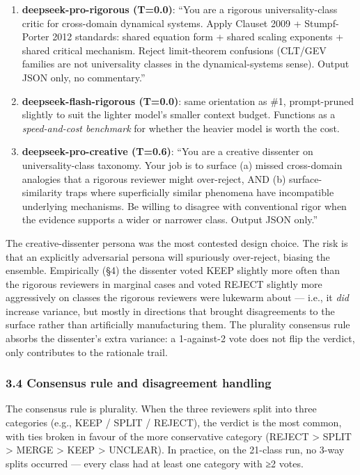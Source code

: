 \documentclass[
  letterpaper,
  11pt]{article}
\providecommand{\tightlist}{%
  \setlength{\itemsep}{0pt}\setlength{\parskip}{0pt}}
\begin{document}
\begin{enumerate}
\def\labelenumi{\arabic{enumi}.}
\tightlist
\item
  \textbf{deepseek-pro-rigorous (T=0.0)}: ``You are a rigorous
  universality-class critic for cross-domain dynamical systems. Apply
  Clauset 2009 + Stumpf-Porter 2012 standards: shared equation form +
  shared scaling exponents + shared critical mechanism. Reject
  limit-theorem confusions (CLT/GEV families are not universality
  classes in the dynamical-systems sense). Output JSON only, no
  commentary.''
\item
  \textbf{deepseek-flash-rigorous (T=0.0)}: same orientation as \#1,
  prompt-pruned slightly to suit the lighter model's smaller context
  budget. Functions as a \emph{speed-and-cost benchmark} for whether the
  heavier model is worth the cost.
\item
  \textbf{deepseek-pro-creative (T=0.6)}: ``You are a creative dissenter
  on universality-class taxonomy. Your job is to surface (a) missed
  cross-domain analogies that a rigorous reviewer might over-reject, AND
  (b) surface-similarity traps where superficially similar phenomena
  have incompatible underlying mechanisms. Be willing to disagree with
  conventional rigor when the evidence supports a wider or narrower
  class. Output JSON only.''
\end{enumerate}

The creative-dissenter persona was the most contested design choice. The
risk is that an explicitly adversarial persona will spuriously
over-reject, biasing the ensemble. Empirically (§4) the dissenter voted
KEEP slightly more often than the rigorous reviewers in marginal cases
and voted REJECT slightly more aggressively on classes the rigorous
reviewers were lukewarm about --- i.e., it \emph{did} increase variance,
but mostly in directions that brought disagreements to the surface
rather than artificially manufacturing them. The plurality consensus
rule absorbs the dissenter's extra variance: a 1-against-2 vote does not
flip the verdict, only contributes to the rationale trail.

\subsubsection{3.4 Consensus rule and disagreement
handling}\label{consensus-rule-and-disagreement-handling}

The consensus rule is plurality. When the three reviewers split into
three categories (e.g., KEEP / SPLIT / REJECT), the verdict is the most
common, with ties broken in favour of the more conservative category
(REJECT \textgreater{} SPLIT \textgreater{} MERGE \textgreater{} KEEP
\textgreater{} UNCLEAR). In practice, on the 21-class run, no 3-way
splits occurred --- every class had at least one category with ≥2 votes.
\end{document}
